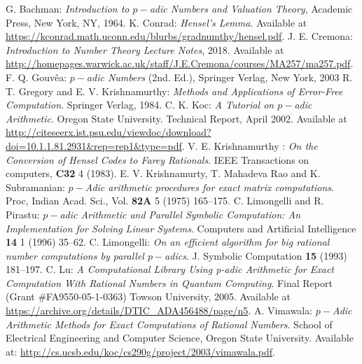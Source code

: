 \documentclass[fleqn]{cas-sc}
\begin{document}
\begin{thebibliography}{99}
 G. Bachman: \emph{Introduction to $p-$adic Numbers and Valuation Theory}, 
Academic Press, New York, NY, 1964.
 K. Conrad: \emph{Hensel's Lemma}. Available at
\url{https://kconrad.math.uconn.edu/blurbs/gradnumthy/hensel.pdf}.
 J. E. Cremona: \emph{Introduction to Number Theory Lecture Notes}, 2018.
Available at \url{http://homepages.warwick.ac.uk/staff/J.E.Cremona/courses/MA257/ma257.pdf}.
 F. Q. Gouv\^ea: \emph{$p-$adic Numbers} (2nd. Ed.), Springer Verlag, New York, 2003
 R. T. Gregory and E. V. Krishnamurthy: \emph{Methods and Applications
of Error-Free Computation}. Springer Verlag, 1984.
 C. K. Koc: \emph{A Tutorial on $p-$adic Arithmetic}. Oregon State University. 
Technical Report, April 2002. Available at
\url{http://citeseerx.ist.psu.edu/viewdoc/download?doi=10.1.1.81.2931&rep=rep1&type=pdf}.
 V. E. Krishnamurthy : \emph{On the Conversion of Hensel Codes to Farey
Rationals}. IEEE Transactions on computers, \textbf{C32} 4 (1983).
 E. V. Krishnamurty, T. Mahadeva Rao and K. Subramanian: \emph{$p-$Adic
arithmetic procedures for exact matrix computations}. Proc, Indian Acad.
Sci., Vol. \textbf{82A} 5 (1975) 165--175.
 C. Limongelli and R. Pirastu: \emph{$p-$adic Arithmetic and Parallel Symbolic
Computation: An Implementation for Solving Linear Systems}.
Computers and Artificial Intelligence \textbf{14} 1 (1996) 35--62.
 C. Limongelli: \emph{On an efficient algorithm for big rational number
computations by parallel $p-$adics}. J. Symbolic Computation \textbf{15} (1993) 181--197.
 C. Lu: \emph{A Computational Library Using p-adic Arithmetic for Exact
Computation With Rational Numbers in Quantum Computing}. Final 
Report (Grant \#FA9550-05-1-0363) Towson University, 2005. Available at
\url{https://archive.org/details/DTIC_ADA456488/page/n5}.
 A. Vimawala: \emph{$p-$Adic Arithmetic Methods for Exact Computations
of Rational Numbers}. School of Electrical Engineering and Computer Science,
Oregon State University. Available at:
\url{http://cs.ucsb.edu/koc/cs290g/project/2003/vimawala.pdf}.
\end{thebibliography}
\end{document}
